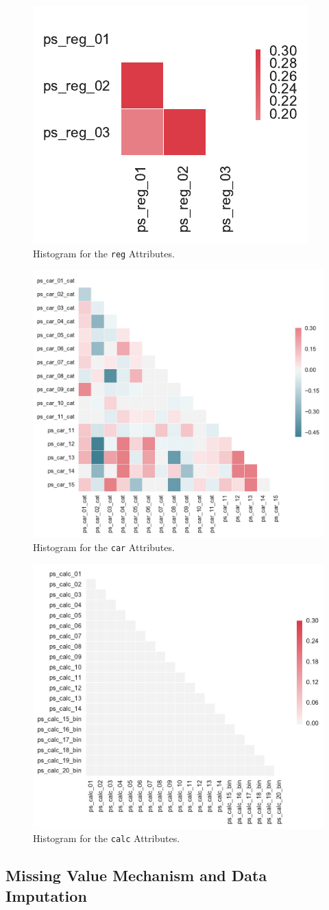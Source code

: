 \documentclass{standalone}
\begin{document}
\begin{figure}[!t]
\centering
\includegraphics[width=.2\textwidth]{fig/corr_reg_col.pdf}
\caption{Histogram for the \lstinline{reg} Attributes.}
\label{corr_reg}
\end{figure}

\begin{figure}[!t]
\centering
\includegraphics[width=.5\textwidth]{fig/corr_car_col.pdf}
\caption{Histogram for the \lstinline{car} Attributes.}
\label{corr_car}
\end{figure}

\begin{figure}[!t]
\centering
\includegraphics[width=.5\textwidth]{fig/corr_calc_col.pdf}
\caption{Histogram for the \lstinline{calc} Attributes.}
\label{corr_calc}
\end{figure}

\subsection{Missing Value Mechanism and Data Imputation}
\end{document}
